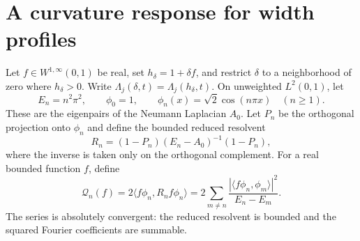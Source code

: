 \documentclass[11pt,a4paper]{article}
\theoremstyle{definition}\newtheorem{definition}[theorem]{Definition}
\theoremstyle{remark}\newtheorem{remark}[theorem]{Remark}
\begin{document}
\section{A curvature response for width profiles}

Let $f\in W^{1,\infty}(0,1)$ be real, set $h_\delta=1+\delta f$,
and restrict $\delta$ to a neighborhood of zero where $h_\delta>0$.
Write $\Lambda_j(\delta,t)=\Lambda_j(h_\delta,t)$. On unweighted
$L^2(0,1)$, let
\[
 E_n=n^2\pi^2,\qquad \phi_0=1,\qquad
 \phi_n(x)=\sqrt2\cos(n\pi x)\quad(n\geq1).
\]
These are the eigenpairs of the Neumann Laplacian $A_0$. Let
$P_n$ be the orthogonal projection onto $\phi_n$ and define the
bounded reduced resolvent
\[
 R_n=(1-P_n)(E_n-A_0)^{-1}(1-P_n),
\]
where the inverse is taken only on the orthogonal complement.
For a real bounded function $f$, define
\begin{equation}\label{eq:profile-response}
 \mathcal Q_n(f)=2\langle f\phi_n,R_n f\phi_n\rangle
 =2\sum_{m\ne n}
  \frac{|\langle f\phi_n,\phi_m\rangle|^2}{E_n-E_m}.
\end{equation}
The series is absolutely convergent: the reduced resolvent is
bounded and the squared Fourier coefficients are summable.
\end{document}

